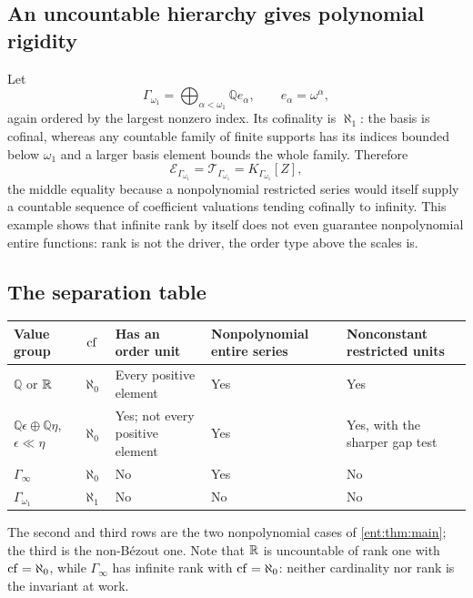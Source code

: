 \documentclass[11pt]{article}
\theoremstyle{plain}
\theoremstyle{plain}
\theoremstyle{plain}
\theoremstyle{definition}
\theoremstyle{definition}
\theoremstyle{definition}
\theoremstyle{definition}
\theoremstyle{remark}
\newcommand{\Q}{\mathbb Q}\newcommand{\Z}{\mathbb Z}\newcommand{\N}{\mathbb N}
\begin{document}
\subsection{An uncountable hierarchy gives polynomial rigidity}
\label{ent:subsec:omega-one}
Let
\begin{equation}\label{ent:eq:Gamma-omegaone}
 \Gamma_{\omega_1}=\bigoplus_{\alpha<\omega_1}\Q e_\alpha,
 \qquad e_\alpha=\omega^\alpha,
\end{equation}
again ordered by the largest nonzero index. Its cofinality is $\aleph_1$: the
basis is cofinal, whereas any countable family of finite supports has its
indices bounded below $\omega_1$ and a larger basis element bounds the whole
family. Therefore
\begin{equation}\label{ent:eq:uncountable-rigidity}
 \mathcal E_{\Gamma_{\omega_1}}
 =\mathcal T_{\Gamma_{\omega_1}}
 =K_{\Gamma_{\omega_1}}[Z],
\end{equation}
the middle equality because a nonpolynomial restricted series would itself
supply a countable sequence of coefficient valuations tending cofinally to
infinity. This example shows that infinite rank by itself does not even
guarantee nonpolynomial entire functions: rank is not the driver, the order
type above the scales is.

\subsection{The separation table}
\label{ent:subsec:table}
\begin{center}\small
\begin{tabularx}{\textwidth}{@{}p{}cYYY@{}}
\toprule
Value group & $\operatorname{cf}$ & Has an order unit & Nonpolynomial entire series &
Nonconstant restricted units\\\midrule
$\Q$ or $\mathbb R$ & $\aleph_0$ & Every positive element & Yes & Yes\\[0.45em]
$\Q\epsilon\oplus\Q\eta$, $\epsilon\ll\eta$ & $\aleph_0$ &
Yes; not every positive element & Yes & Yes, with the sharper gap
test\\[0.45em]
$\Gamma_\infty$ & $\aleph_0$ & No & Yes & No\\[0.45em]
$\Gamma_{\omega_1}$ & $\aleph_1$ & No & No & No\\
\bottomrule
\end{tabularx}
\end{center}

The second and third rows are the two nonpolynomial cases of
\cref{ent:thm:main}; the third is the non-B\'ezout one. Note that $\mathbb R$ is
uncountable of rank one with $\operatorname{cf}=\aleph_0$, while $\Gamma_\infty$ has
infinite rank with $\operatorname{cf}=\aleph_0$: neither cardinality nor rank is the
invariant at work.
\end{document}
